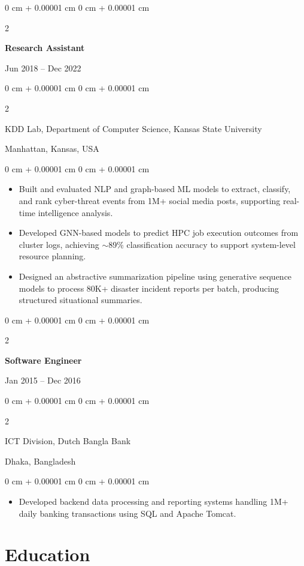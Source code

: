 \documentclass[10pt, letterpaper]{article}
\newenvironment{highlights}{
    \begin{itemize}[
        topsep=0.10 cm,
        parsep=0.10 cm,
        partopsep=0pt,
        itemsep=0pt,
        leftmargin=0 cm + 10pt
    ]
}{
    \end{itemize}
} %
\newenvironment{onecolentry}{
    \begin{adjustwidth}{
        0 cm + 0.00001 cm
    }{
        0 cm + 0.00001 cm
    }
}{
    \end{adjustwidth}
} %
\newenvironment{twocolentry}[2][]{
    \onecolentry
    \def\secondColumn{#2}
    \setcolumnwidth{\fill, 4.5 cm}
    \begin{paracol}{2}
}{
    \switchcolumn \raggedleft \secondColumn
    \end{paracol}
    \endonecolentry
} %
\begin{document}
    \vspace{1mm}

    \begin{twocolentry}{Jun 2018 -- Dec 2022}
        \textbf{Research Assistant}
    \end{twocolentry}
    \begin{twocolentry}{Manhattan, Kansas, USA}
       KDD Lab, Department of Computer Science, Kansas State University
    \end{twocolentry}
    \vspace{0.10 cm}
    \begin{onecolentry}
        \begin{highlights}
            \item Built and evaluated NLP and graph-based ML models to extract, classify, and rank cyber-threat events from 1M+ social media posts, supporting real-time intelligence analysis.
            \item Developed GNN-based models to predict HPC job execution outcomes from cluster logs, achieving $\sim$89\% classification accuracy to support system-level resource planning.
            \item Designed an abstractive summarization pipeline using generative sequence models to process 80K+ disaster incident reports per batch, producing structured situational summaries.
        \end{highlights}
    \end{onecolentry}

    \vspace{0.1 cm}
    \begin{twocolentry}{Jan 2015 -- Dec 2016}
        \textbf{Software Engineer}
    \end{twocolentry}
    \begin{twocolentry}{Dhaka, Bangladesh}
       ICT Division, Dutch Bangla Bank
    \end{twocolentry}

    \begin{onecolentry}
        \begin{highlights}
            \item Developed backend data processing and reporting systems handling 1M+ daily banking transactions using SQL and Apache Tomcat.
        \end{highlights}
    \end{onecolentry}

\section{Education}
\end{document}
